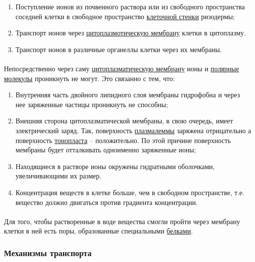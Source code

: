 \begin{enumerate}

	\item Поступление ионов из почвенного раствора или из свободного пространства соседней клетки в свободное пространство \hyperlink{cell_wall}{клеточной стенки} ризодермы;
	\item Транспорт ионов через \hyperlink{plasmolema}{цитоплазмотическую мембрану} клетки в цитоплазму.
	\item Транспорт ионов в различные органеллы клетки через их мембраны. 

\end{enumerate}

\paragraph*{}Непосредственно через саму \hyperlink{plasmolema}{цитоплазматическую мембрану} ионы и \hyperlink{polarMolecula}{полярные молекулы} проникнуть не могут. Это связанно с тем, что:

\begin{enumerate}

	\item Внутренняя часть двойного липидного слоя мембраны гидрофобна и через нее заряженные частицы проникнуть не способны;
	\item Внешняя сторона цитоплазматической мембраны, в свою очередь, имеет электрический заряд. Так, поверхность \hyperlink{plasmolema}{плазмалеммы} заряжена отрицательно а поверхность \hyperlink{cell_vakuol}{тонопласта} -- положительно. По этой причине поверхность мембраны будет отталкивать одноименно заряженные ионы;
	\item Находящиеся в растворе ионы окружены гидратными оболочками, увеличивающими их размер.
	\item Концентрация веществ в клетке больше, чем в свободном пространстве, т.е. вещество должно двигаться против градиента концентрации.  

\end{enumerate}

\paragraph*{}Для того, чтобы растворенные в воде вещества смогли пройти через мембрану клетки в ней есть поры, образованные специальными \hyperlink{proteins}{белками}. 

\subsubsection*{Механизмы транспорта}

